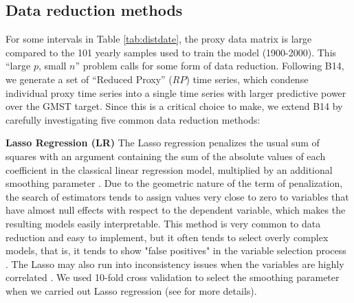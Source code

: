 \documentclass[12pt]{amsart}
\theoremstyle{plain}
\theoremstyle{definition}
\theoremstyle{remark}
\newcommand{\lb}[1]{\color{MidnightBlue}\textbf{[LB: #1]}\normalcolor}
\newcommand{\jeg}[1]{\color{ProcessBlue}\textbf{[JEG: #1]}\normalcolor}
\begin{document}
\subsection{Data reduction methods}
\label{sec:rp}

For some intervals in Table \ref{tab:distdate}, the proxy data matrix is large compared to the 101 yearly samples used to train the model (1900-2000). This ``large $p$, small $n$'' problem calls for some form of data reduction. Following B14, we generate a set of ``Reduced Proxy'' ($RP$) time series, which condense individual proxy time series into a single time series with larger predictive power over the GMST target. Since this is a critical choice to make, we extend B14 by carefully investigating five common data reduction methods:




{\bf Lasso Regression (LR)}
  The Lasso regression penalizes the usual sum of squares with an argument
 containing the sum of the absolute values of each coefficient in the classical
 linear regression model, multiplied by an additional smoothing parameter \citep{Tibshirani1996}. Due
 to the geometric nature of the term of penalization, the search of estimators
 tends to assign values very close to zero to variables that have almost null
 effects with respect to the dependent variable, which makes the resulting
 models easily interpretable. This method is very common to data reduction and easy to implement, but it often tends to select overly complex models, that is,
 it tends to show "false positives" in the variable selection process 
 \citep{Fan2010}. The Lasso may also run into inconsistency issues when the
 variables are highly correlated \citep{Zou2005}.
 We used 10-fold cross validation to select the smoothing parameter when we carried out Lasso regression (see \cite{Tibshirani1996} for more details). 
 
\end{document}
